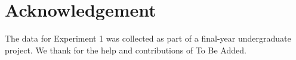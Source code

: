 \documentclass[10pt,letterpaper]{article}
\begin{document}
\section{Acknowledgement}

The data for Experiment 1 was collected as part of a final-year undergraduate project. We thank for the help and contributions of To Be Added.



\setlength{\bibleftmargin}{.125in}
\setlength{\bibindent}{-\bibleftmargin}


\end{document}
